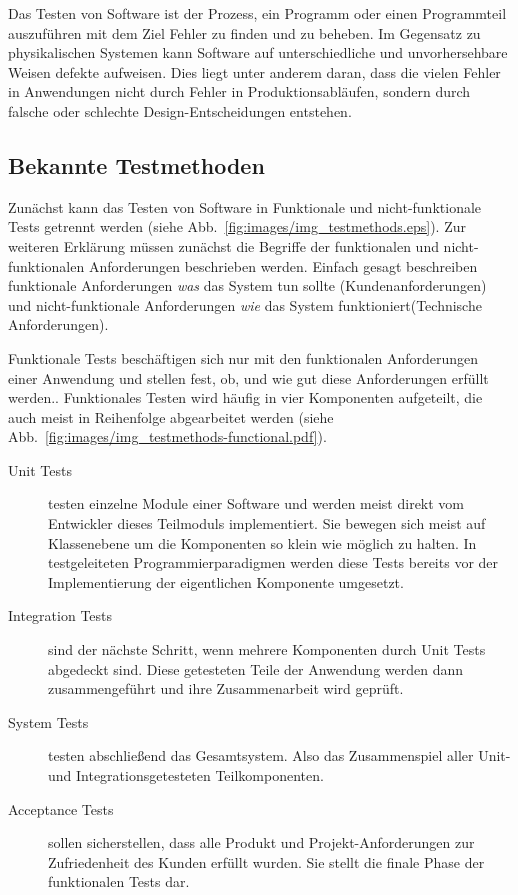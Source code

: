 \documentclass[12pt,a4paper,bibliography=totocnumbered,listof=totocnumbered]{scrartcl}
\begin{document}
Das Testen von Software ist der Prozess, ein Programm oder einen Programmteil auszuführen mit dem Ziel Fehler zu finden und zu beheben. Im Gegensatz zu physikalischen Systemen kann Software auf unterschiedliche und unvorhersehbare Weisen defekte aufweisen. Dies liegt unter anderem daran, dass die vielen Fehler in Anwendungen nicht durch Fehler in Produktionsabläufen, sondern durch falsche oder schlechte Design-Entscheidungen entstehen.\cite{pantesting}

\subsection{Bekannte Testmethoden}\label{ch:soft-test}

Zunächst kann das Testen von Software in Funktionale und nicht-funktionale Tests getrennt werden (siehe Abb.~\ref{fig:images/img_testmethods.eps}). Zur weiteren Erklärung müssen zunächst die Begriffe der funktionalen und nicht-funktionalen Anforderungen beschrieben werden. Einfach gesagt beschreiben funktionale Anforderungen \textit{was} das System tun sollte (Kundenanforderungen) und nicht-funktionale Anforderungen \textit{wie} das System funktioniert(Technische Anforderungen).\cite{erikssonreq}


Funktionale Tests beschäftigen sich nur mit den funktionalen Anforderungen einer Anwendung und stellen fest, ob, und wie gut diese Anforderungen erfüllt werden.\cite{erikssontesting}. Funktionales Testen wird häufig in vier Komponenten aufgeteilt, die auch meist in Reihenfolge abgearbeitet werden (siehe Abb.~\ref{fig:images/img_testmethods-functional.pdf}).\cite{inflectra}

\begin{description}
	\item[Unit Tests] testen einzelne Module einer Software und werden meist direkt vom Entwickler dieses Teilmoduls implementiert. Sie bewegen sich meist auf Klassenebene um die Komponenten so klein  wie möglich zu halten. In testgeleiteten Programmierparadigmen werden diese Tests bereits vor der Implementierung der eigentlichen Komponente umgesetzt.\cite{inflectra}
	\item[Integration Tests] sind der nächste Schritt, wenn mehrere Komponenten durch Unit Tests abgedeckt sind. Diese getesteten Teile der Anwendung werden dann zusammengeführt und ihre Zusammenarbeit wird geprüft.\cite{inflectra}
	\item[System Tests] testen abschließend das Gesamtsystem. Also das Zusammenspiel aller Unit- und Integrationsgetesteten Teilkomponenten.\cite{inflectra}
	\item[Acceptance Tests] sollen sicherstellen, dass alle Produkt und Projekt-Anforderungen zur Zufriedenheit des Kunden erfüllt wurden. Sie stellt die finale Phase der funktionalen Tests dar.\cite{inflectra}
\end{description}
\end{document}
